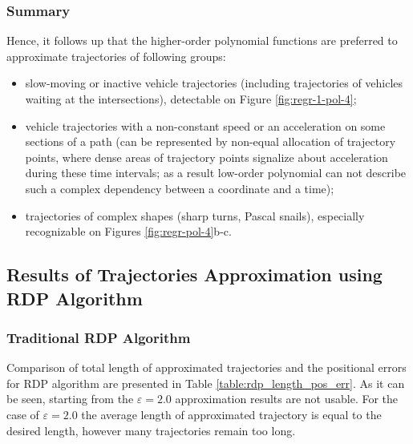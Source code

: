 \subsubsection{Summary}

Hence, it follows up that the higher-order polynomial functions are preferred to approximate trajectories of following groups:

\begin{itemize}
	\setlength\itemsep{0em}
	\item slow-moving or inactive vehicle trajectories (including trajectories of vehicles waiting at the intersections), detectable on Figure \ref{fig:regr-1-pol-4};
	\item vehicle trajectories with a non-constant speed or an acceleration on some sections of a path (can be represented by non-equal allocation of trajectory points, where dense areas of trajectory points signalize about acceleration during these time intervals; as a result low-order polynomial can not describe such a complex dependency between a coordinate and a time);
	\item trajectories of complex shapes (sharp turns, Pascal snails), especially recognizable on Figures \ref{fig:regr-pol-4}b-c.
\end{itemize}

\subsection{Results of Trajectories Approximation using RDP Algorithm}

\subsubsection{Traditional RDP Algorithm}

Comparison of total length of approximated trajectories and the positional errors for RDP algorithm are presented in Table \ref{table:rdp_length_pos_err}. As it can be seen, starting from the $\varepsilon = 2.0$ approximation results are not usable. For the case of $\varepsilon = 2.0$ the average length of approximated trajectory is equal to the desired length, however many trajectories remain too long.


